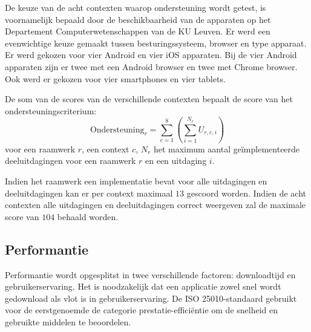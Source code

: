  \begin{table}
 \centering
 \resizebox{\textwidth}{!} {
 }
 \caption{Acht contexten: apparaten met hun soort, lancering, besturingssysteem~(BS) en browser.}
 \label{tabel:toestellen-hci}
 \end{table}
 
De keuze van de acht contexten waarop ondersteuning wordt getest, is voornamelijk bepaald door de beschikbaarheid van de apparaten op het Departement Computerwetenschappen van de KU Leuven.
Er werd een evenwichtige keuze gemaakt tussen besturingssysteem,  browser en type apparaat.
Er werd gekozen voor vier Android en vier iOS apparaten.
Bij de vier Android apparaten zijn er twee met een Android browser en twee met Chrome browser.
Ook werd er gekozen voor vier smartphones en vier tablets.

De som van de scores van de verschillende contexten bepaalt de score van het ondersteuningscriterium:
\begin{equation}
  \text{Ondersteuning}_r = \sum_{c=1}^{8}{\left(\sum_{i=1}^{N_r}U_{r,c,i}\right)}
  \label{eq:ondersteuning}
\end{equation}
voor  een raamwerk $r$, een context $c$, $N_r$ het maximum aantal geïmplementeerde deeluitdagingen voor een raamwerk $r$ en een uitdaging $i$. 


Indien het raamwerk een implementatie bevat voor alle uitdagingen en deeluitdagingen kan er per context maximaal $13$ gescoord worden.
Indien de acht contexten alle uitdagingen en deeluitdagingen correct weergeven zal de maximale score van $104$ behaald worden.


\subsection{Performantie}
\label{sec:vergelijking-performantie}
Performantie wordt opgesplitst in twee verschillende factoren: downloadtijd en gebruikerservaring.
Het is noodzakelijk dat een applicatie zowel snel wordt gedownload als vlot is in gebruikerservaring.
De ISO 25010-standaard gebruikt voor de eerstgenoemde de categorie prestatie-efficiëntie om de snelheid en gebruikte middelen te beoordelen.

